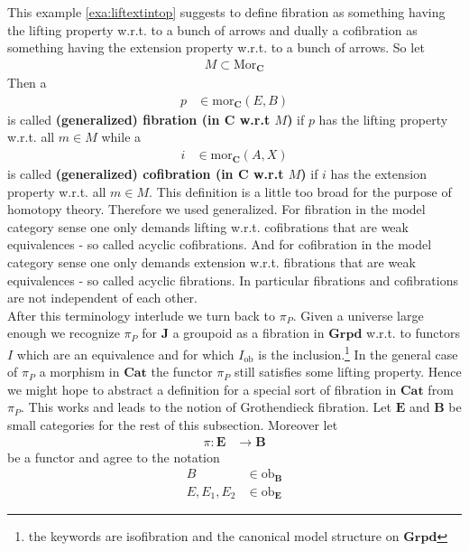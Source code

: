This example \ref{exa:liftextintop} suggests to define fibration as something having the lifting property w.r.t. to a bunch of arrows and dually a cofibration as something having the extension property w.r.t. to a bunch of arrows. So let
\begin{align*}
  M
  \subset
  \mathrm{Mor}_{\mathbf{C}}
\end{align*}
Then a 
\begin{align*}
  p
  &\in
  \mathrm{mor}_{\mathbf{C}}(E,B)
\end{align*}
is called \textbf{(generalized) fibration (in $\mathbf{C}$ w.r.t $M$)} if $p$ has the lifting property w.r.t. all $m \in M$ while a 
\begin{align*}
  i
  &\in
  \mathrm{mor}_{\mathbf{C}}(A,X)
\end{align*}
is called \textbf{(generalized) cofibration (in $\mathbf{C}$ w.r.t $M$)} if $i$ has the extension property w.r.t. all $m \in M$. This definition is a little too broad for the purpose of homotopy theory. Therefore we used {\glqq}generalized{\grqq}. For fibration in the model category sense one only demands lifting w.r.t. cofibrations that are weak equivalences - so called acyclic cofibrations. And for cofibration in the model category sense one only demands extension w.r.t. fibrations that are weak equivalences - so called acyclic fibrations. In particular fibrations and cofibrations are not independent of each other.
\\
After this terminology interlude we turn back to $\pi_{P}$. Given a universe large enough we recognize $\pi_{P}$ for $\mathbf{J}$ a groupoid as a fibration in $\mathbf{Grpd}$ w.r.t. to functors $I$ which are an equivalence and for which $I_{\textrm{ob}}$ is the inclusion.\footnote{the keywords are isofibration and the canonical model structure on $\mathbf{Grpd}$} In the general case of $\pi_{P}$ a morphism in $\mathbf{Cat}$ the functor $\pi_{P}$ still satisfies some lifting property. Hence we might hope to abstract a definition for a special sort of fibration in $\mathbf{Cat}$ from $\pi_{P}$. This works and leads to the notion of Grothendieck fibration. Let $\mathbf{E}$ and $\mathbf{B}$ be small categories for the rest of this subsection. Moreover let
\begin{align*}
  \pi
  \colon
  \mathbf{E}
  &\rightarrow
  \mathbf{B}
\end{align*}
be a functor and agree to the notation
\begin{align*}
  B
  &\in
  \mathrm{ob}_{\mathbf{B}}
  \\
  E,
  E_{1},
  E_{2}
  &\in
  \mathrm{ob}_{\mathbf{E}}
\end{align*}
